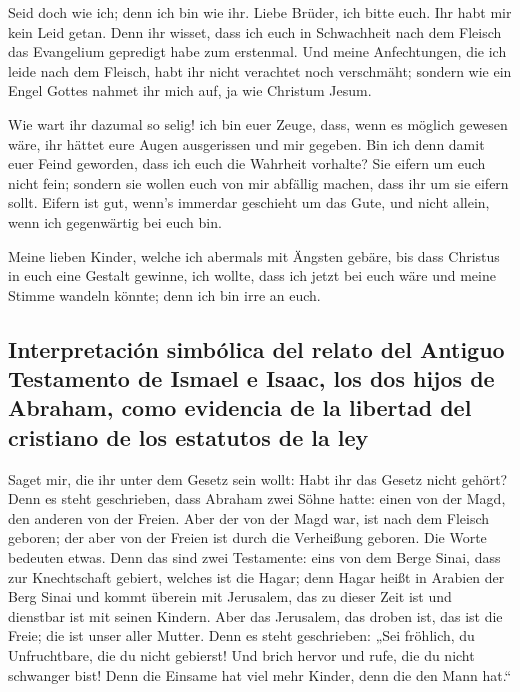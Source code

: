  Seid doch wie ich; denn ich bin wie ihr. Liebe Brüder,
ich bitte euch. Ihr habt mir kein Leid getan.  Denn ihr
wisset, dass ich euch in Schwachheit nach dem Fleisch das Evangelium
gepredigt habe zum erstenmal.  Und meine Anfechtungen,
die ich leide nach dem Fleisch, habt ihr nicht verachtet noch
verschmäht; sondern wie ein Engel Gottes nahmet ihr mich auf, ja wie
Christum Jesum.

 Wie wart ihr dazumal so selig! ich bin euer Zeuge, dass,
wenn es möglich gewesen wäre, ihr hättet eure Augen ausgerissen und mir
gegeben.  Bin ich denn damit euer Feind geworden, dass
ich euch die Wahrheit vorhalte?  Sie eifern um euch nicht
fein; sondern sie wollen euch von mir abfällig machen, dass ihr um sie
eifern sollt.  Eifern ist gut, wenn's immerdar geschieht
um das Gute, und nicht allein, wenn ich gegenwärtig bei euch bin.

 Meine lieben Kinder, welche ich abermals mit Ängsten
gebäre, bis dass Christus in euch eine Gestalt gewinne, 
ich wollte, dass ich jetzt bei euch wäre und meine Stimme wandeln
könnte; denn ich bin irre an euch.

\hypertarget{interpretaciuxf3n-simbuxf3lica-del-relato-del-antiguo-testamento-de-ismael-e-isaac-los-dos-hijos-de-abraham-como-evidencia-de-la-libertad-del-cristiano-de-los-estatutos-de-la-ley}{%
\subsection{Interpretación simbólica del relato del Antiguo Testamento
de Ismael e Isaac, los dos hijos de Abraham, como evidencia de la
libertad del cristiano de los estatutos de la
ley}\label{interpretaciuxf3n-simbuxf3lica-del-relato-del-antiguo-testamento-de-ismael-e-isaac-los-dos-hijos-de-abraham-como-evidencia-de-la-libertad-del-cristiano-de-los-estatutos-de-la-ley}}

 Saget mir, die ihr unter dem Gesetz sein wollt: Habt ihr
das Gesetz nicht gehört?  Denn es steht geschrieben, dass
Abraham zwei Söhne hatte: einen von der Magd, den anderen von der
Freien.  Aber der von der Magd war, ist nach dem Fleisch
geboren; der aber von der Freien ist durch die Verheißung geboren.
 Die Worte bedeuten etwas. Denn das sind zwei Testamente:
eins von dem Berge Sinai, dass zur Knechtschaft gebiert, welches ist die
Hagar;  denn Hagar heißt in Arabien der Berg Sinai und
kommt überein mit Jerusalem, das zu dieser Zeit ist und dienstbar ist
mit seinen Kindern.  Aber das Jerusalem, das droben ist,
das ist die Freie; die ist unser aller Mutter.  Denn es
steht geschrieben: „Sei fröhlich, du Unfruchtbare, die du nicht
gebierst! Und brich hervor und rufe, die du nicht schwanger bist! Denn
die Einsame hat viel mehr Kinder, denn die den Mann hat.``

